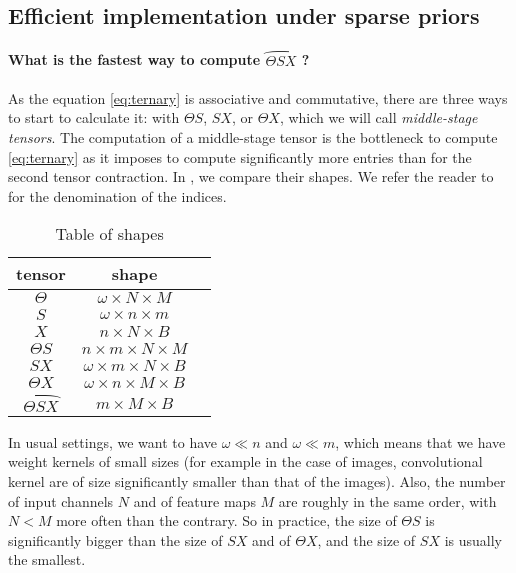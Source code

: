 \subsection{Efficient implementation under sparse priors}

\paragraph{What is the fastest way to compute $\wideparen{\Theta S X}$ ?}
As the equation \eqref{eq:ternary} is associative and commutative, there are three ways to start to calculate it: with $\Theta S$, $SX$, or $\Theta X$, which we will call \emph{middle-stage tensors}. The computation of a middle-stage tensor is the bottleneck to compute \eqref{eq:ternary} as it imposes to compute significantly more entries than for the second tensor contraction. In , we compare their shapes. We refer the reader to  for the denomination of the indices.

\begin{table}[H]
  \centering
\begin{tabular}{ccc}
  tensor & shape\\
  \hline
  $\Theta$ & $\omega \times N \times M$\\
  $S$ & $\omega \times n \times m$\\
  $X$ & $n \times N \times B$\\
  $\Theta S$ & $n \times m \times N \times M$\\
  $SX$ & $\omega \times m \times N \times B$\\
  $\Theta X$ & $\omega \times n \times M \times B$\\
  $\wideparen{\Theta SX}$ & $m \times M \times B$
\end{tabular}
\caption{Table of shapes}
\label{tab:mid}
\end{table}

In usual settings, we want to have $\omega \ll n$ and $\omega \ll m$, which means that we have weight kernels of small sizes (for example in the case of images, convolutional kernel are of size significantly smaller than that of the images). Also, the number of input channels $N$ and of feature maps $M$ are roughly in the same order, with $N < M$ more often than the contrary. So in practice, the size of $\Theta S$ is significantly bigger than the size of $SX$ and of $\Theta X$, and the size of $SX$ is usually the smallest.

